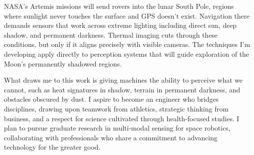 \documentclass[12pt]{article}
\begin{document}
NASA's Artemis missions will send rovers into the lunar South Pole, regions where sunlight never touches the surface and GPS doesn't exist. Navigation there demands sensors that work across extreme lighting including direct sun, deep shadow, and permanent darkness. Thermal imaging cuts through these conditions, but only if it aligns precisely with visible cameras. The techniques I'm developing apply directly to perception systems that will guide exploration of the Moon's permanently shadowed regions.

What draws me to this work is giving machines the ability to perceive what we cannot, such as heat signatures in shadow, terrain in permanent darkness, and obstacles obscured by dust. I aspire to become an engineer who bridges disciplines, drawing upon teamwork from athletics, strategic thinking from business, and a respect for science cultivated through health-focused studies. I plan to pursue graduate research in multi-modal sensing for space robotics, collaborating with professionals who share a commitment to advancing technology for the greater good.
\end{document}
